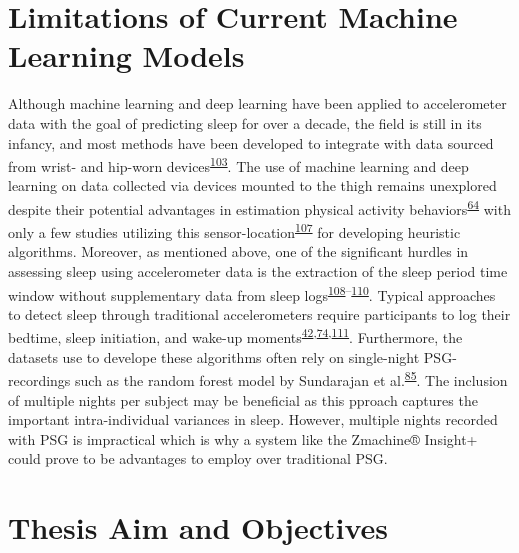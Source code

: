 \documentclass[
  10pt,
]{scrbook}
\begin{document}
\hypertarget{limitations-of-current-machine-learning-models}{%
\section{Limitations of Current Machine Learning
Models}\label{limitations-of-current-machine-learning-models}}

Although machine learning and deep learning have been applied to
accelerometer data with the goal of predicting sleep for over a decade,
the field is still in its infancy, and most methods have been developed
to integrate with data sourced from wrist- and hip-worn
devices\textsuperscript{\protect\hyperlink{ref-conley_agreement_2019}{103}}.
The use of machine learning and deep learning on data collected via
devices mounted to the thigh remains unexplored despite their potential
advantages in estimation physical activity
behaviors\textsuperscript{\protect\hyperlink{ref-bruxf8nd_2020}{64}}
with only a few studies utilizing this
sensor-location\textsuperscript{\protect\hyperlink{ref-winkler_identifying_2016}{107}}
for developing heuristic algorithms. Moreover, as mentioned above, one
of the significant hurdles in assessing sleep using accelerometer data
is the extraction of the sleep period time window without supplementary
data from sleep
logs\textsuperscript{\protect\hyperlink{ref-doherty_large_2017}{108}--\protect\hyperlink{ref-anderson_assessment_2014}{110}}.
Typical approaches to detect sleep through traditional accelerometers
require participants to log their bedtime, sleep initiation, and wake-up
moments\textsuperscript{\protect\hyperlink{ref-girschik_validation_2012}{42},\protect\hyperlink{ref-littner_2003}{74},\protect\hyperlink{ref-lockley_1999}{111}}.
Furthermore, the datasets use to develope these algorithms often rely on
single-night PSG-recordings such as the random forest model by
Sundarajan et
al.\textsuperscript{\protect\hyperlink{ref-sundararajan_sleep_2021}{85}}.
The inclusion of multiple nights per subject may be beneficial as this
pproach captures the important intra-individual variances in sleep.
However, multiple nights recorded with PSG is impractical which is why a
system like the Zmachine® Insight+ could prove to be advantages to
employ over traditional PSG.

\hypertarget{thesis-aim-and-objectives}{%
\section{Thesis Aim and Objectives}\label{thesis-aim-and-objectives}}
\end{document}
